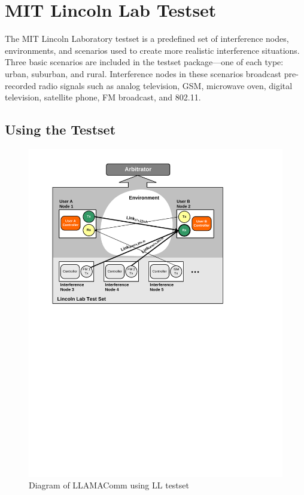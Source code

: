 \chapter{MIT Lincoln Lab Testset}

The MIT Lincoln Laboratory testset is a predefined set of
interference nodes, environments, and scenarios used to create more
realistic interference situations.  Three basic scenarios are
included in the testset package---one of each type: urban, suburban,
and rural. Interference nodes in these scenarios broadcast
pre-recorded radio signals such as analog television, GSM, microwave
oven, digital television, satellite phone, FM broadcast, and 802.11.

\section{Using the Testset}

\begin{figure}[h]
\centering
\includegraphics[width=5in]{"figs/Testset"}
\caption{Diagram of LLAMAComm using LL testset}
\label{fig:testSetEx}
\end{figure}

